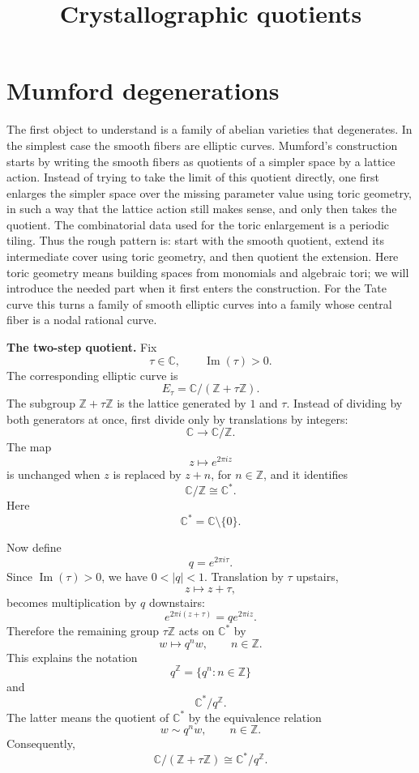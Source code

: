 



\title{Crystallographic quotients}
\maketitle

\label{section-phantom}

\tableofcontents

\section{Mumford degenerations}
\label{section-mumford-degenerations}

\noindent
The first object to understand is a family of
abelian varieties that degenerates. In the
simplest case the smooth fibers are elliptic
curves. Mumford's construction starts by
writing the smooth fibers as quotients of a
simpler space by a lattice action. Instead of
trying to take the limit of this quotient
directly, one first enlarges the simpler space
over the missing parameter value using toric
geometry, in such a way that the lattice
action still makes sense, and only then takes
the quotient. The combinatorial data used for
the toric enlargement is a periodic tiling.
Thus the rough pattern is: start with the
smooth quotient, extend its intermediate
cover using toric geometry, and then quotient
the extension. Here toric geometry means
building spaces from monomials and algebraic
tori; we will introduce the needed part when
it first enters the construction. For the
Tate curve this turns a family of
smooth elliptic curves into a family whose
central fiber is a nodal rational curve.

\medskip\noindent
{\bf The two-step quotient.}
Fix
$$
\tau\in\mathbb{C},
\qquad
\operatorname{Im}(\tau)>0.
$$
The corresponding elliptic curve is
$$
E_\tau
=
\mathbb{C}/
(\mathbb{Z}+\tau\mathbb{Z}).
$$
The subgroup
$\mathbb{Z}+\tau\mathbb{Z}$ is the lattice
generated by $1$ and $\tau$. Instead of
dividing by both generators at once, first
divide only by translations by integers:
$$
\mathbb{C}
\longrightarrow
\mathbb{C}/\mathbb{Z}.
$$
The map
$$
z\longmapsto e^{2\pi i z}
$$
is unchanged when $z$ is replaced by $z+n$,
for $n\in\mathbb{Z}$, and it identifies
$$
\mathbb{C}/\mathbb{Z}
\cong
\mathbb{C}^*.
$$
Here
$$
\mathbb{C}^*
=
\mathbb{C}\setminus\{0\}.
$$

\medskip\noindent
Now define
$$
q=e^{2\pi i\tau}.
$$
Since $\operatorname{Im}(\tau)>0$, we have
$0<|q|<1$. Translation by $\tau$ upstairs,
$$
z\longmapsto z+\tau,
$$
becomes multiplication by $q$ downstairs:
$$
e^{2\pi i(z+\tau)}
=
q e^{2\pi i z}.
$$
Therefore the remaining group
$\tau\mathbb{Z}$ acts on
$\mathbb{C}^*$ by
$$
w\longmapsto q^n w,
\qquad n\in\mathbb{Z}.
$$
This explains the notation
$$
q^{\mathbb{Z}}
=
\{q^n:n\in\mathbb{Z}\}
$$
and
$$
\mathbb{C}^*/q^{\mathbb{Z}}.
$$
The latter means the quotient of
$\mathbb{C}^*$ by the equivalence relation
$$
w\sim q^n w,
\qquad n\in\mathbb{Z}.
$$
Consequently,
$$
\boxed{
\mathbb{C}/
(\mathbb{Z}+\tau\mathbb{Z})
\cong
\mathbb{C}^*/q^{\mathbb{Z}}
}.
$$

